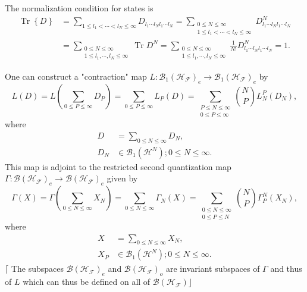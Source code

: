 \documentclass[aps,preprint]{revtex4}%
\begin{document}
The normalization condition for states is
\begin{align}
\operatorname{Tr}\left\{  D\right\}   &  =\sum_{1\leq l_{1}<\cdots<l_{N}%
\leq\infty}D_{l_{1}\cdots l_{N}l_{1}\cdots l_{N}}=\sum_{\substack{0\leq
N\leq\infty\\1\leq l_{1}<\cdots<l_{N}\leq\infty}}D_{l_{1}\cdots l_{N}%
l_{1}\cdots l_{N}}^{N}\nonumber\\
&  =\sum_{\substack{0\leq N\leq\infty\\1\leq l_{1},\cdots,l_{N}\leq\infty
}}\operatorname{Tr}D^{N}=\sum_{\substack{0\leq N\leq\infty\\1\leq l_{1}%
,\cdots,l_{N}\leq\infty}}\frac{1}{N!}D_{l_{1}\cdots l_{N}l_{1}\cdots l_{N}%
}^{N}=1.
\end{align}


One can construct a "contraction" map $L:\mathcal{B}_{1}\left(  \mathcal{H}%
_{\mathcal{F}}\right)  _{e}\rightarrow\mathcal{B}_{1}\left(  \mathcal{H}%
_{\mathcal{F}}\right)  _{e}$ by
\begin{equation}
L\left(  D\right)  =L\left(  \sum_{0\leq P\leq\infty}D_{P}\right)
=\sum_{0\leq P\leq\infty}L_{P}\left(  D\right)  =\sum_{\substack{P\leq
N\leq\infty\\0\leq P\leq\infty}}\binom{N}{P}L_{N}^{P}\left(  D_{N}\right)  ,
\end{equation}
where
\begin{align}
D &  =\sum_{0\leq N\leq\infty}D_{N},\nonumber\\
D_{N} &  \in\mathcal{B}_{1}\left(  \mathcal{H}^{N}\right)  ;0\leq N\leq\infty.
\end{align}
This map is adjoint to the restricted second quantization map $\Gamma
:\mathcal{B}\left(  \mathcal{H}_{\mathcal{F}}\right)  _{e}\rightarrow
\mathcal{B}\left(  \mathcal{H}_{\mathcal{F}}\right)  _{e}$ given by
\begin{equation}
\Gamma\left(  X\right)  =\Gamma\left(  \sum_{0\leq N\leq\infty}X_{N}\right)
=\sum_{0\leq N\leq\infty}\Gamma_{N}\left(  X\right)  =\sum_{\substack{0\leq
N\leq\infty\\0\leq P\leq N}}\binom{N}{P}\Gamma_{P}^{N}\left(  X_{N}\right)  ,
\end{equation}
where
\begin{align}
X &  =\sum_{0\leq N\leq\infty}X_{N},\nonumber\\
X_{P} &  \in\mathcal{B}_{1}\left(  \mathcal{H}^{N}\right)  ;0\leq N\leq
\infty.\nonumber
\end{align}
$\lceil$ The subspaces $\mathcal{B}\left(  \mathcal{H}_{\mathcal{F}}\right)
_{e}$ and $\mathcal{B}\left(  \mathcal{H}_{\mathcal{F}}\right)  _{o}$ are
invariant subspaces of $\Gamma$ and thus of $L$ which can thus be defined on
all of $\mathcal{B}\left(  \mathcal{H}_{\mathcal{F}}\right)  \rfloor$
\end{document}
